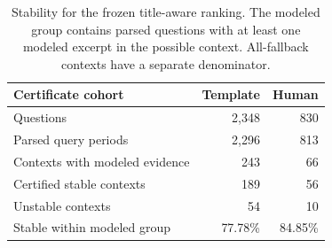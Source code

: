 \begin{table}[t]
\centering\small
\begin{tabular}{@{}lrr@{}}
\toprule
Certificate cohort & Template & Human\\
\midrule
Questions & 2,348 & 830\\
Parsed query periods & 2,296 & 813\\
Contexts with modeled evidence & 243 & 66\\
Certified stable contexts & 189 & 56\\
Unstable contexts & 54 & 10\\
Stable within modeled group & 77.78\% & 84.85\%\\
\bottomrule
\end{tabular}
\caption{Stability for the frozen title-aware ranking. The modeled group contains parsed questions with at least one modeled excerpt in the possible context. All-fallback contexts have a separate denominator.}
\label{tab:mechanism}
\end{table}
